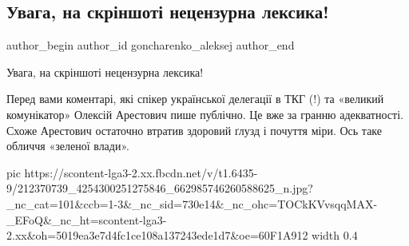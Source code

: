  
 
 
 
 
 
\subsection{Увага, на скріншоті нецензурна лексика!}
\label{sec:03_07_2021.fb.goncharenko_aleksej.1.materschina_arestovich_tkg}
\ifcmt
 author_begin
   author_id goncharenko_aleksej
 author_end
\fi

Увага, на скріншоті нецензурна лексика!

Перед вами коментарі, які спікер української делегації в ТКГ (!) та «великий
комунікатор» Олексій Арестович пише публічно. Це вже за гранню адекватності.
Схоже Арестович остаточно втратив здоровий ґлузд і почуття міри. Ось таке
обличчя «зеленої влади».

\ifcmt
  pic https://scontent-lga3-2.xx.fbcdn.net/v/t1.6435-9/212370739_4254300251275846_662985746260588625_n.jpg?_nc_cat=101&ccb=1-3&_nc_sid=730e14&_nc_ohc=TOCkKVvsqqMAX-_EFoQ&_nc_ht=scontent-lga3-2.xx&oh=5019ea3e7d4fc1ce108a137243ede1d7&oe=60F1A912
  width 0.4
\fi
